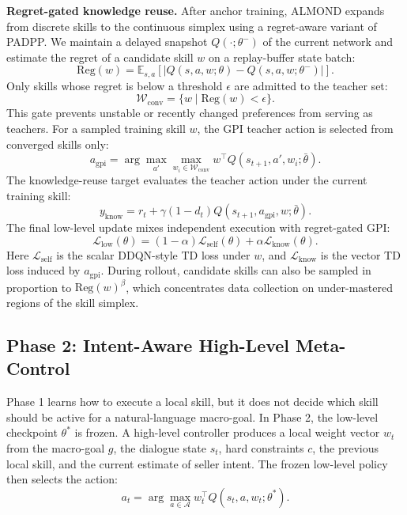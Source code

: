 \documentclass[conference]{IEEEtran}
\begin{document}
\textbf{Regret-gated knowledge reuse.}
After anchor training, ALMOND expands from discrete skills to the continuous
simplex using a regret-aware variant of PADPP. We maintain a delayed snapshot
$Q(\cdot;\theta^-)$ of the current network and estimate the regret of a
candidate skill $w$ on a replay-buffer state batch:
\begin{equation}
    \mathrm{Reg}(w)=
    \mathbb{E}_{s,a}\left[
    \left|Q(s,a,w;\theta)-Q(s,a,w;\theta^-)\right|
    \right].
\end{equation}
Only skills whose regret is below a threshold $\epsilon$ are admitted to the
teacher set:
\begin{equation}
    \mathcal{W}_{\mathrm{conv}} =
    \{w \mid \mathrm{Reg}(w)<\epsilon\}.
\end{equation}
This gate prevents unstable or recently changed preferences from serving as
teachers. For a sampled training skill $w$, the GPI teacher action is selected
from converged skills only:
\begin{equation}
    a_{\mathrm{gpi}} =
    \arg\max_{a'}\max_{w_i \in \mathcal{W}_{\mathrm{conv}}}
    w^{\top}Q(s_{t+1},a',w_i;\bar{\theta}).
\end{equation}
The knowledge-reuse target evaluates the teacher action under the current
training skill:
\begin{equation}
    y_{\mathrm{know}} =
    r_t + \gamma(1-d_t)
    Q(s_{t+1},a_{\mathrm{gpi}},w;\bar{\theta}).
\end{equation}
The final low-level update mixes independent execution with regret-gated GPI:
\begin{equation}
    \mathcal{L}_{\mathrm{low}}(\theta)=
    (1-\alpha)\mathcal{L}_{\mathrm{self}}(\theta)
    + \alpha\mathcal{L}_{\mathrm{know}}(\theta).
\end{equation}
Here $\mathcal{L}_{\mathrm{self}}$ is the scalar DDQN-style TD loss under $w$,
and $\mathcal{L}_{\mathrm{know}}$ is the vector TD loss induced by
$a_{\mathrm{gpi}}$. During rollout, candidate skills can also be sampled in
proportion to $\mathrm{Reg}(w)^\beta$, which concentrates data collection on
under-mastered regions of the skill simplex.

\subsection{Phase 2: Intent-Aware High-Level Meta-Control}

Phase 1 learns how to execute a local skill, but it does not decide which skill
should be active for a natural-language macro-goal. In Phase 2, the low-level
checkpoint $\theta^{*}$ is frozen. A high-level controller produces a local
weight vector $w_t$ from the macro-goal $g$, the dialogue state $s_t$, hard
constraints $c$, the previous local skill, and the current estimate of seller
intent. The frozen low-level policy then selects the action:
\begin{equation}
    a_t =
    \arg\max_{a \in \mathcal{A}}
    w_t^{\top}Q(s_t,a,w_t;\theta^{*}).
\end{equation}
\end{document}
